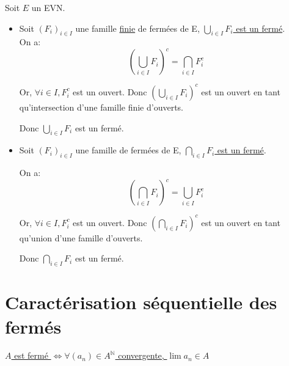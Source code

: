 \documentclass[]{article}
\begin{document}
Soit $E$ un EVN. 

\begin{itemize}
    \item Soit $(F_i)_{i \in I}$ une famille \underline{finie} de fermées de E, \underline{$\bigcup_{i\in I} F_i$ est un fermé}. \\
    
    On a:
    \[ (\bigcup_{i\in I} F_i)^c = \bigcap_{i \in I} F_i^c \]

    Or, $\forall i \in I, F_i^c$ est un ouvert. Donc $\left (\bigcup_{i\in I} F_i \right )^c$ est un ouvert en tant qu'intersection d'une famille finie d'ouverts. 
    
    Donc $\bigcup_{i\in I} F_i$ est un fermé. 

    \item Soit $(F_i)_{i \in I}$ une famille de fermées de E, \underline{$\bigcap_{i\in I} F_i$ est un fermé}.
    
    On a:
    \[ (\bigcap_{i\in I} F_i)^c = \bigcup_{i \in I} F_i^c \]

    Or, $\forall i \in I, F_i^c$ est un ouvert. Donc $\left (\bigcap_{i\in I} F_i \right )^c$ est un ouvert en tant qu'union d'une famille d'ouverts. 
    
    Donc $\bigcap_{i\in I} F_i$ est un fermé. 

\end{itemize}

\section{Caractérisation séquentielle des fermés}

\underline{$A$ est fermé $\iff \forall (a_n) \in A^{\mathbb{N}}$ convergente, $\lim a_n \in A$}
\end{document}

